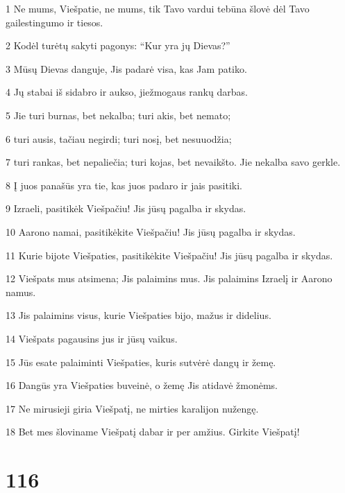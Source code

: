 \par 1 Ne mums, Viešpatie, ne mums, tik Tavo vardui tebūna šlovė dėl Tavo gailestingumo ir tiesos. 
\par 2 Kodėl turėtų sakyti pagonys: “Kur yra jų Dievas?” 
\par 3 Mūsų Dievas danguje, Jis padarė visa, kas Jam patiko. 
\par 4 Jų stabai iš sidabro ir aukso, jie­žmogaus rankų darbas. 
\par 5 Jie turi burnas, bet nekalba; turi akis, bet nemato; 
\par 6 turi ausis, tačiau negirdi; turi nosį, bet nesuuodžia; 
\par 7 turi rankas, bet nepaliečia; turi kojas, bet nevaikšto. Jie nekalba savo gerkle. 
\par 8 Į juos panašūs yra tie, kas juos padaro ir jais pasitiki. 
\par 9 Izraeli, pasitikėk Viešpačiu! Jis jūsų pagalba ir skydas. 
\par 10 Aarono namai, pasitikėkite Viešpačiu! Jis jūsų pagalba ir skydas. 
\par 11 Kurie bijote Viešpaties, pasitikėkite Viešpačiu! Jis jūsų pagalba ir skydas. 
\par 12 Viešpats mus atsimena; Jis palaimins mus. Jis palaimins Izraelį ir Aarono namus. 
\par 13 Jis palaimins visus, kurie Viešpaties bijo, mažus ir didelius. 
\par 14 Viešpats pagausins jus ir jūsų vaikus. 
\par 15 Jūs esate palaiminti Viešpaties, kuris sutvėrė dangų ir žemę. 
\par 16 Dangūs yra Viešpaties buveinė, o žemę Jis atidavė žmonėms. 
\par 17 Ne mirusieji giria Viešpatį, ne mirties karalijon nužengę. 
\par 18 Bet mes šloviname Viešpatį dabar ir per amžius. Girkite Viešpatį!


\chapter{116}


